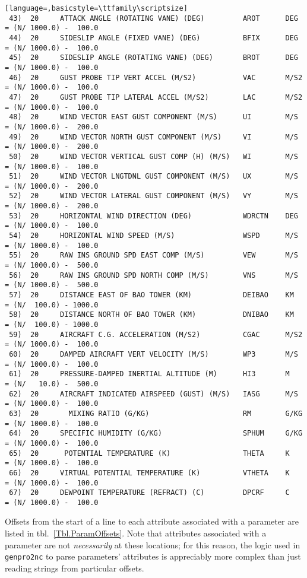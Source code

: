 \documentclass{report}
\begin{document}
\begin{lstlisting}[language=,basicstyle=\ttfamily\scriptsize]
 43)  20     ATTACK ANGLE (ROTATING VANE) (DEG)         AROT      DEG     = (N/ 1000.0) -  100.0
 44)  20     SIDESLIP ANGLE (FIXED VANE) (DEG)          BFIX      DEG     = (N/ 1000.0) -  100.0
 45)  20     SIDESLIP ANGLE (ROTATING VANE) (DEG)       BROT      DEG     = (N/ 1000.0) -  100.0
 46)  20     GUST PROBE TIP VERT ACCEL (M/S2)           VAC       M/S2    = (N/ 1000.0) -  100.0
 47)  20     GUST PROBE TIP LATERAL ACCEL (M/S2)        LAC       M/S2    = (N/ 1000.0) -  100.0
 48)  20     WIND VECTOR EAST GUST COMPONENT (M/S)      UI        M/S     = (N/ 1000.0) -  200.0
 49)  20     WIND VECTOR NORTH GUST COMPONENT (M/S)     VI        M/S     = (N/ 1000.0) -  200.0
 50)  20     WIND VECTOR VERTICAL GUST COMP (H) (M/S)   WI        M/S     = (N/ 1000.0) -  100.0
 51)  20     WIND VECTOR LNGTDNL GUST COMPONENT (M/S)   UX        M/S     = (N/ 1000.0) -  200.0
 52)  20     WIND VECTOR LATERAL GUST COMPONENT (M/S)   VY        M/S     = (N/ 1000.0) -  200.0
 53)  20     HORIZONTAL WIND DIRECTION (DEG)            WDRCTN    DEG     = (N/ 1000.0) -  100.0
 54)  20     HORIZONTAL WIND SPEED (M/S)                WSPD      M/S     = (N/ 1000.0) -  100.0
 55)  20     RAW INS GROUND SPD EAST COMP (M/S)         VEW       M/S     = (N/ 1000.0) -  500.0
 56)  20     RAW INS GROUND SPD NORTH COMP (M/S)        VNS       M/S     = (N/ 1000.0) -  500.0
 57)  20     DISTANCE EAST OF BAO TOWER (KM)            DEIBAO    KM      = (N/  100.0) - 1000.0
 58)  20     DISTANCE NORTH OF BAO TOWER (KM)           DNIBAO    KM      = (N/  100.0) - 1000.0
 59)  20     AIRCRAFT C.G. ACCELERATION (M/S2)          CGAC      M/S2    = (N/ 1000.0) -  100.0
 60)  20     DAMPED AIRCRAFT VERT VELOCITY (M/S)        WP3       M/S     = (N/ 1000.0) -  100.0
 61)  20     PRESSURE-DAMPED INERTIAL ALTITUDE (M)      HI3       M       = (N/   10.0) -  500.0
 62)  20     AIRCRAFT INDICATED AIRSPEED (GUST) (M/S)   IASG      M/S     = (N/ 1000.0) -  100.0
 63)  20       MIXING RATIO (G/KG)                      RM        G/KG    = (N/ 1000.0) -  100.0
 64)  20     SPECIFIC HUMIDITY (G/KG)                   SPHUM     G/KG    = (N/ 1000.0) -  100.0
 65)  20      POTENTIAL TEMPERATURE (K)                 THETA     K       = (N/ 1000.0) -  100.0
 66)  20     VIRTUAL POTENTIAL TEMPERATURE (K)          VTHETA    K       = (N/ 1000.0) -  100.0
 67)  20     DEWPOINT TEMPERATURE (REFRACT) (C)         DPCRF     C       = (N/ 1000.0) -  100.0
\end{lstlisting}

Offsets from the start of a line to each attribute associated with a parameter are listed in tbl.~\ref{Tbl.ParamOffsets}. Note that attributes associated with a parameter are not \textit{necessarily} at these locations; for this reason, the logic used in \texttt{genpro2nc} to parse parameters' attributes is appreciably more complex than just reading strings from particular offsets.
\end{document}
